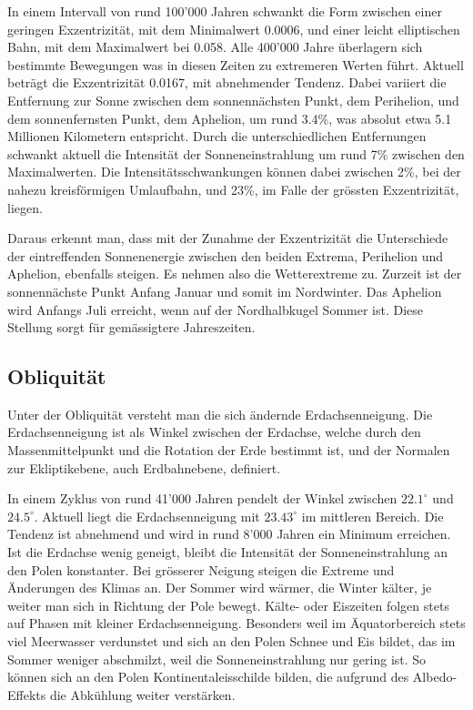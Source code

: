 In einem Intervall von rund 100'000 Jahren schwankt die Form zwischen einer geringen Exzentrizität, mit dem Minimalwert 0.0006, und einer leicht elliptischen Bahn, mit dem Maximalwert bei 0.058.
Alle 400'000 Jahre überlagern sich bestimmte Bewegungen was in diesen Zeiten zu extremeren Werten führt.
Aktuell beträgt die Exzentrizität 0.0167, mit abnehmender Tendenz.
Dabei variiert die Entfernung zur Sonne zwischen dem sonnennächsten Punkt, dem Perihelion, und dem son\-nen\-fern\-sten Punkt, dem Aphelion, um rund 3.4\%, was absolut etwa 5.1 Millionen Kilometern entspricht.
%
%
Durch die unterschiedlichen Entfernungen schwankt aktuell die Intensität der Sonneneinstrahlung um rund 7\% zwischen den Maximalwerten.
Die Intensitätsschwankungen können dabei zwischen 2\%, bei der nahezu kreisförmigen Umlaufbahn, und 23\%, im Falle der grössten Exzentrizität, liegen.

Daraus erkennt man, dass mit der Zunahme der Exzentrizität die Unterschiede der eintreffenden Sonnenenergie zwischen den beiden Extrema, Perihelion und Aphelion, ebenfalls steigen.
Es nehmen also die Wetterextreme zu.
Zurzeit ist der sonnennächste Punkt Anfang Januar und somit im Nordwinter. Das Aphelion wird Anfangs Juli erreicht, wenn auf der Nordhalbkugel Sommer ist.
Diese Stellung sorgt für gemässigtere Jahreszeiten. 

\subsection{Obliquität
\label{milankovic:subsection:Obliquität}}
Unter der Obliquität versteht man die sich ändernde Erdachsenneigung.
%
%
Die Erdachsenneigung ist als Winkel zwischen der Erdachse, welche durch den Massenmittelpunkt und die Rotation der Erde bestimmt ist, und der Normalen zur Ekliptikebene, auch Erdbahnebene, definiert.
%

In einem Zyklus von rund 41'000 Jahren pendelt der Winkel zwischen $22.1^\circ$ und $24.5^\circ$.
Aktuell liegt die Erdachsenneigung mit $23.43^\circ$ im mittleren Bereich.
Die Tendenz ist abnehmend und wird in rund 8’000 Jahren ein Minimum erreichen.
Ist die Erdachse wenig geneigt, bleibt die Intensität der Sonneneinstrahlung an den Polen konstanter.
Bei grösserer Neigung steigen die Extreme und Änderungen des Klimas an.
Der Sommer wird wärmer, die Winter kälter, je weiter man sich in Richtung der Pole bewegt.
Kälte- oder Eiszeiten folgen stets auf Phasen mit kleiner Erdachsenneigung.
Besonders weil im Äquatorbereich stets viel Meerwasser verdunstet und sich an den Polen Schnee und Eis bildet, das im Sommer weniger abschmilzt, weil die Sonneneinstrahlung nur gering ist.
So können sich an den Polen Kontinentaleisschilde bilden, die aufgrund des Albedo-Effekts die Abkühlung weiter verstärken.
%
%

